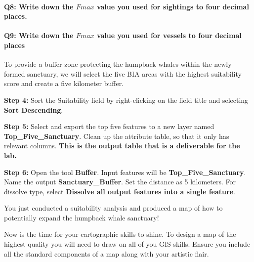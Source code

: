 \documentclass[
]{book}
\begin{document}
\hypertarget{q8-write-down-the-fmax-value-you-used-for-sightings-to-four-decimal-places.}{%
\paragraph*{\texorpdfstring{Q8: Write down the \(Fmax\) value you used for sightings to four decimal places.}{Q8: Write down the Fmax value you used for sightings to four decimal places.}}\label{q8-write-down-the-fmax-value-you-used-for-sightings-to-four-decimal-places.}}

\hypertarget{q9-write-down-the-fmax-value-you-used-for-vessels-to-four-decimal-places}{%
\paragraph*{\texorpdfstring{Q9: Write down the \(Fmax\) value you used for vessels to four decimal places}{Q9: Write down the Fmax value you used for vessels to four decimal places}}\label{q9-write-down-the-fmax-value-you-used-for-vessels-to-four-decimal-places}}

To provide a buffer zone protecting the humpback whales within the newly formed sanctuary, we will select the five BIA areas with the highest suitability score and create a five kilometer buffer.

\textbf{Step 4:} Sort the Suitability field by right-clicking on the field title and selecting \textbf{Sort Descending}.

\textbf{Step 5:} Select and export the top five features to a new layer named \textbf{Top\_Five\_Sanctuary}. Clean up the attribute table, so that it only has relevant columns. \textbf{This is the output table that is a deliverable for the lab.}

\textbf{Step 6:} Open the tool \textbf{Buffer}. Input features will be \textbf{Top\_Five\_Sanctuary}. Name the output \textbf{Sanctuary\_Buffer}. Set the distance as 5 kilometers. For dissolve type, select \textbf{Dissolve all output features into a single feature}.

You just conducted a suitability analysis and produced a map of how to potentially expand the humpback whale sanctuary!

Now is the time for your cartographic skills to shine. To design a map of the highest quality you will need to draw on all of you GIS skills. Ensure you include all the standard components of a map along with your artistic flair.
\end{document}
